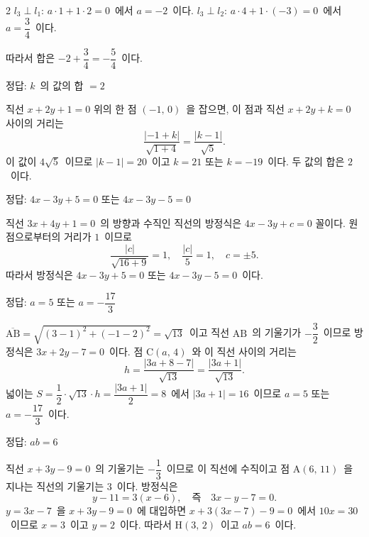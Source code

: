 \documentclass[10pt,fleqn]{article}
\begin{document}
\begin{multicols*}{2}
$l_3 \perp l_1$: $a \cdot 1 + 1 \cdot 2 = 0$\ 에서 $a = -2$\ 이다.
$l_3 \perp l_2$: $a \cdot 4 + 1 \cdot (-3) = 0$\ 에서 $a = \dfrac{3}{4}$\ 이다.

따라서 합은 $-2 + \dfrac{3}{4} = -\dfrac{5}{4}$\ 이다.

\begin{dmanswerbox}
정답: $k$\ 의 값의 합 $= 2$
\end{dmanswerbox}

직선 $x + 2y + 1 = 0$ 위의 한 점 $(-1,\, 0)$\ 을 잡으면, 이 점과 직선 $x + 2y + k = 0$ 사이의 거리는
\[ \dfrac{|-1 + k|}{\sqrt{1 + 4}} = \dfrac{|k - 1|}{\sqrt{5}}. \]
이 값이 $4\sqrt{5}$\ 이므로 $|k - 1| = 20$\ 이고 $k = 21$ 또는 $k = -19$\ 이다. 두 값의 합은 $2$\ 이다.

\begin{dmanswerbox}
정답: $4x-3y+5=0$ 또는 $4x-3y-5=0$
\end{dmanswerbox}

직선 $3x + 4y + 1 = 0$\ 의 방향과 수직인 직선의 방정식은 $4x - 3y + c = 0$ 꼴이다. 원점으로부터의 거리가 $1$\ 이므로
\[ \dfrac{|c|}{\sqrt{16 + 9}} = 1,\quad \dfrac{|c|}{5} = 1,\quad c = \pm 5. \]
따라서 방정식은 $4x - 3y + 5 = 0$ 또는 $4x - 3y - 5 = 0$\ 이다.

\begin{dmanswerbox}
정답: $a = 5$ 또는 $a = -\dfrac{17}{3}$
\end{dmanswerbox}

$\overline{\mathrm{AB}} = \sqrt{(3-1)^2 + (-1-2)^2} = \sqrt{13}$\ 이고 직선 $\mathrm{AB}$\ 의 기울기가 $-\dfrac{3}{2}$\ 이므로 방정식은 $3x + 2y - 7 = 0$\ 이다. 점 $\mathrm{C}(a,\, 4)$\ 와 이 직선 사이의 거리는
\[ h = \dfrac{|3a + 8 - 7|}{\sqrt{13}} = \dfrac{|3a + 1|}{\sqrt{13}}. \]
넓이는 $S = \dfrac{1}{2} \cdot \sqrt{13} \cdot h = \dfrac{|3a+1|}{2} = 8$\ 에서 $|3a + 1| = 16$\ 이므로 $a = 5$ 또는 $a = -\dfrac{17}{3}$\ 이다.

\begin{dmanswerbox}
정답: $ab=6$
\end{dmanswerbox}

직선 $x + 3y - 9 = 0$\ 의 기울기는 $-\dfrac{1}{3}$\ 이므로 이 직선에 수직이고 점 $\mathrm{A}(6,\, 11)$\ 을 지나는 직선의 기울기는 $3$\ 이다. 방정식은
\[ y - 11 = 3(x - 6),\quad \text{즉}\quad 3x - y - 7 = 0. \]
$y = 3x - 7$\ 을 $x + 3y - 9 = 0$\ 에 대입하면 $x + 3(3x - 7) - 9 = 0$\ 에서 $10x = 30$\ 이므로 $x = 3$\ 이고 $y = 2$\ 이다. 따라서 $\mathrm{H}(3,\, 2)$\ 이고 $ab = 6$\ 이다.

\end{multicols*}
\end{document}
